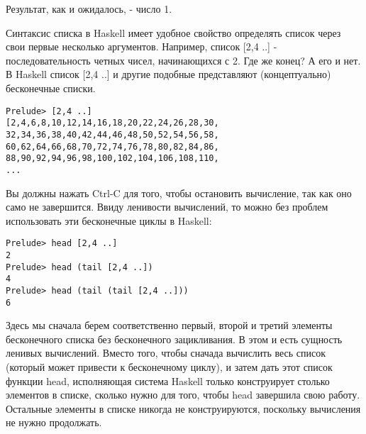 Результат, как и ожидалось, - число 1.


Синтаксис списка в Haskell имеет удобное свойство определять 
список через свои первые несколько аргументов. Например, 
список [2,4 ..] - последовательность четных чисел, начинающихся с 2. 
Где же конец? А его и нет. В Haskell список [2,4 ..] и другие подобные 
представляют (концептуально) бесконечные списки.   


 \begin{verbatim}
Prelude> [2,4 ..]
[2,4,6,8,10,12,14,16,18,20,22,24,26,28,30,
32,34,36,38,40,42,44,46,48,50,52,54,56,58,
60,62,64,66,68,70,72,74,76,78,80,82,84,86,
88,90,92,94,96,98,100,102,104,106,108,110,
...
\end{verbatim} 


Вы должны нажать Ctrl-C для того, чтобы остановить вычисление, так 
как оно само не завершится. Ввиду ленивости вычислений, то можно без проблем 
использовать эти бесконечные циклы в Haskell:

 \begin{verbatim}
Prelude> head [2,4 ..]
2
Prelude> head (tail [2,4 ..])
4
Prelude> head (tail (tail [2,4 ..]))
6
\end{verbatim} 


Здесь мы сначала берем соответственно первый, второй и третий элементы бесконечного 
списка без бесконечного зацикливания. В этом  и есть сущность ленивых вычислений. 
Вместо того, чтобы сначада вычислить весь список (который может привести к 
бесконечному циклу), и затем дать этот список функции head, исполняющая система Haskell 
только конструирует столько элементов в списке, сколько нужно для того, чтобы 
head завершила свою работу. Остальные элементы в списке никогда не конструируются, 
поскольку вычисления не нужно продолжать.   


